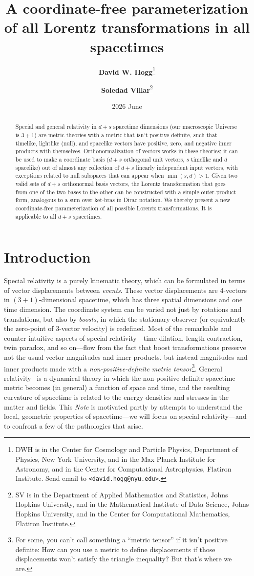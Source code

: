 \documentclass{article}
\title{\bfseries A coordinate-free parameterization of all Lorentz transformations in all spacetimes}
\author{\textbf{David W. Hogg}\footnote{DWH is in the Center for Cosmology and Particle Physics, Department of Physics, New York University, and in the Max Planck Institute for Astronomy, and in the Center for Computational Astrophysics, Flatiron Institute. Send email to \texttt{<david.hogg@nyu.edu>}.}
        \and
        \textbf{Soledad Villar}\footnote{SV is in the Department of Applied Mathematics and Statistics, Johns Hopkins University, and in the Mathematical Institute of Data Science, Johns Hopkins University, and in the Center for Computational Mathematics, Flatiron Institute.}}
\date{2026 June}
\newcommand{\plus}{\!+\!} %
\newcommand{\documentname}{\textsl{Note}}
\begin{document}
\thispagestyle{plain}
\maketitle

\begin{abstract}\noindent %
    Special and general relativity in $d+s$ spacetime dimensions (our macroscopic Universe is $3+1$) are metric theories with a metric that isn't positive definite, such that timelike, lightlike (null), and spacelike vectors have positive, zero, and negative inner products with themselves.
    Orthonormalization of vectors works in these theories; it can be used to make a coordinate basis ($d+s$ orthogonal unit vectors, $s$ timelike and $d$ spacelike) out of almost any collection of $d+s$ linearly independent input vectors, with exceptions related to null subspaces that can appear when $\min(s,d)>1$.
    Given two valid sets of $d+s$ orthonormal basis vectors, the Lorentz transformation that goes from one of the two bases to the other can be constructed with a simple outer-product form, analogous to a sum over ket-bras in Dirac notation.
    We thereby present a new coordinate-free parameterization of all possible Lorentz transformations.
    It is applicable to all $d+s$ spacetimes.
\end{abstract}

\section{Introduction}\label{sec:intro}

Special relativity \cite{sr} is a purely kinematic theory, which can be formulated in terms of vector displacements between \emph{events}.
These vector displacements are 4-vectors in $(3\plus1)$-dimensional spacetime, which has three spatial dimensions and one time dimension.
The coordinate system can be varied not just by rotations and translations, but also by \emph{boosts}, in which the stationary observer (or equivalently the zero-point of 3-vector velocity) is redefined.
Most of the remarkable and counter-intuitive aspects of special relativity---time dilation, length contraction, twin paradox, and so on---flow from the fact that boost transformations preserve not the usual vector magnitudes and inner products, but instead magnitudes and inner products made with a \emph{non-positive-definite metric tensor}\footnote{For some, you can't call something a ``metric tensor'' if it isn't positive definite: How can you use a metric to define displacements if those displacements won't satisfy the triangle inequality? But that's where we are.}.
General relativity~\cite{gr} is a dynamical theory in which the non-positive-definite spacetime metric becomes (in general) a function of space and time, and the resulting curvature of spacetime is related to the energy densities and stresses in the matter and fields.
This \documentname{} is motivated partly by attempts to understand the local, geometric properties of spacetime---we will focus on special relativity---and to confront a few of the pathologies that arise.
\end{document}
